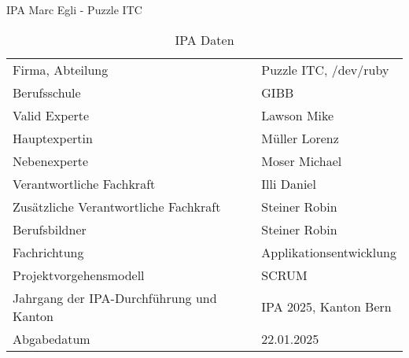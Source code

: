 \begin{titlepage}
  \Huge IPA Marc Egli - Puzzle ITC \normalsize
\bigbreak
\begin{table}[h!]
    \begin{tabular}{|L{0.4\textwidth}|L{0.5\textwidth}|}
        \hline
          \\[12pt]
        \hline
        Firma, Abteilung & Puzzle ITC, /dev/ruby \\
        \hline
        Berufsschule & GIBB \\
        \hline
        Valid Experte & Lawson Mike \\ 
        \hline
        Hauptexpertin & Müller Lorenz \\
        \hline
        Nebenexperte & Moser Michael \\
        \hline
        Verantwortliche Fachkraft & Illi Daniel \\
        \hline
        Zusätzliche Verantwortliche Fachkraft & Steiner Robin \\
        \hline
        Berufsbildner & Steiner Robin \\
        \hline
        Fachrichtung & Applikationsentwicklung \\
        \hline
        Projektvorgehensmodell & SCRUM \\
        \hline
        Jahrgang der IPA-Durchführung und Kanton &  IPA 2025, Kanton Bern \\
        \hline
        Abgabedatum & 22.01.2025\\
        \hline
      \end{tabular}
      \caption{IPA Daten}
\end{table}
\end{titlepage}